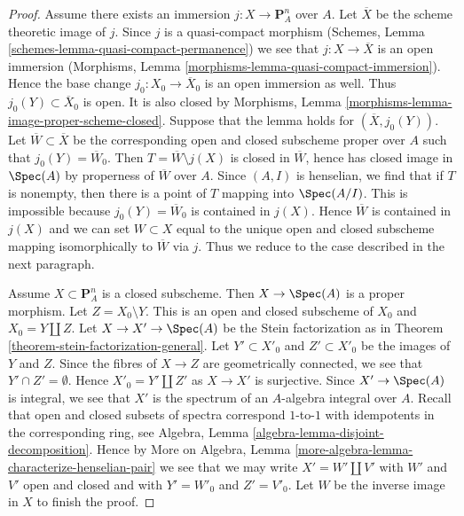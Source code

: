 \begin{proof}
\medskip\noindent
Assume there exists an immersion $j : X \to \mathbf{P}^n_A$ over $A$.
Let $\overline{X}$ be the scheme theoretic image of $j$.
Since $j$ is a quasi-compact morphism
(Schemes, Lemma \ref{schemes-lemma-quasi-compact-permanence})
we see that $j : X \to \overline{X}$ is an open immersion
(Morphisms, Lemma \ref{morphisms-lemma-quasi-compact-immersion}).
Hence the base change $j_0 : X_0 \to \overline{X}_0$
is an open immersion as well.
Thus $j_0(Y) \subset \overline{X}_0$ is open.
It is also closed by Morphisms, Lemma
\ref{morphisms-lemma-image-proper-scheme-closed}.
Suppose that the lemma holds for $(\overline{X}, j_0(Y))$.
Let $\overline{W} \subset \overline{X}$ be the
corresponding open and closed subscheme proper over $A$
such that $j_0(Y) = \overline{W}_0$.
Then $T = \overline{W} \setminus j(X)$ is closed in $\overline{W}$,
hence has closed image in $\Spec(A)$ by properness of $\overline{W}$
over $A$. Since $(A, I)$ is henselian, we find that if $T$
is nonempty, then there is a point of $T$ mapping into $\Spec(A/I)$.
This is impossible because $j_0(Y) = \overline{W}_0$ is contained in $j(X)$.
Hence $\overline{W}$ is contained in $j(X)$ and we can
set $W \subset X$ equal to the unique open and closed
subscheme mapping isomorphically to $\overline{W}$ via $j$.
Thus we reduce to the case described in the next paragraph.

\medskip\noindent
Assume $X \subset \mathbf{P}^n_A$ is a closed subscheme.
Then $X \to \Spec(A)$ is a proper morphism.
Let $Z = X_0 \setminus Y$. This is an open and closed
subscheme of $X_0$ and $X_0 = Y \amalg Z$.
Let $X \to X' \to \Spec(A)$ be the Stein factorization as in
Theorem \ref{theorem-stein-factorization-general}.
Let $Y' \subset X'_0$ and $Z' \subset X'_0$ be the images of
$Y$ and $Z$.
Since the fibres of $X \to Z$ are geometrically connected,
we see that $Y' \cap Z' = \emptyset$.
Hence $X'_0 = Y' \amalg Z'$ as $X \to X'$ is surjective.
Since $X' \to \Spec(A)$ is integral, we see that
$X'$ is the spectrum of an $A$-algebra integral over $A$.
Recall that open and closed subsets of spectra correspond
$1$-to-$1$ with idempotents in the corresponding ring, see
Algebra, Lemma \ref{algebra-lemma-disjoint-decomposition}.
Hence by
More on Algebra, Lemma \ref{more-algebra-lemma-characterize-henselian-pair}
we see that we may write $X' = W' \amalg V'$
with $W'$ and $V'$ open and closed and
with $Y' = W'_0$ and $Z' = V'_0$.
Let $W$ be the inverse image in $X$
to finish the proof.
\end{proof}









